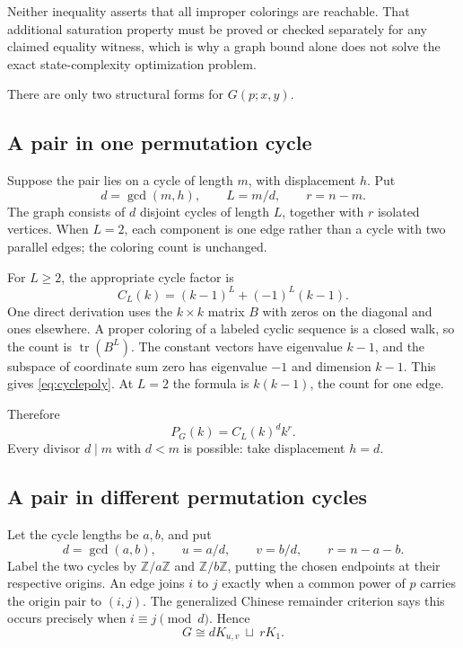 \documentclass[11pt,a4paper]{article}
\numberwithin{equation}{section}
\theoremstyle{definition}
\theoremstyle{remark}
\newcommand{\Z}{\mathbb Z}
\begin{document}
Neither inequality asserts that all improper colorings are reachable. That
additional saturation property must be proved or checked separately for any
claimed equality witness, which is why a graph bound alone does not solve the
exact state-complexity optimization problem.

There are only two structural forms for $G(p;x,y)$.

\subsection{A pair in one permutation cycle}

Suppose the pair lies on a cycle of length $m$, with displacement $h$.
Put
\[
 d=\gcd(m,h),\qquad L=m/d,\qquad r=n-m.
\]
The graph consists of $d$ disjoint cycles of length $L$, together with $r$
isolated vertices. When $L=2$, each component is one edge rather than a
cycle with two parallel edges; the coloring count is unchanged.

For $L\ge2$, the appropriate cycle factor is
\begin{equation}\label{eq:cyclepoly}
 C_L(k)=(k-1)^L+(-1)^L(k-1).
\end{equation}
One direct derivation uses the $k\times k$ matrix $B$ with zeros on the
diagonal and ones elsewhere. A proper coloring of a labeled cyclic sequence
is a closed walk, so the count is $\operatorname{tr}(B^L)$. The constant
vectors have eigenvalue $k-1$, and the subspace of coordinate sum zero has
eigenvalue $-1$ and dimension $k-1$. This gives \eqref{eq:cyclepoly}. At
$L=2$ the formula is $k(k-1)$, the count for one edge.

Therefore
\begin{equation}\label{eq:samecount}
 P_G(k)=C_L(k)^d k^r.
\end{equation}
Every divisor $d\mid m$ with $d<m$ is possible: take displacement $h=d$.

\subsection{A pair in different permutation cycles}

Let the cycle lengths be $a,b$, and put
\[
 d=\gcd(a,b),\qquad u=a/d,\qquad v=b/d,\qquad r=n-a-b.
\]
Label the two cycles by $\Z/a\Z$ and $\Z/b\Z$, putting the chosen endpoints
at their respective origins. An edge joins $i$ to $j$ exactly when a common
power of $p$ carries the origin pair to $(i,j)$. The generalized Chinese
remainder criterion says this occurs precisely when
$i\equiv j\pmod d$. Hence
\[
 G\cong dK_{u,v}\ \sqcup\ rK_1.
\]
\end{document}
